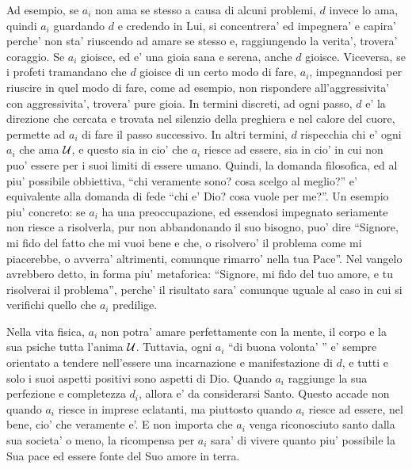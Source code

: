 Ad esempio, se $a_i$ non ama se stesso a causa di alcuni problemi, $d$ invece lo ama, quindi $a_i$ guardando $d$ e credendo in Lui, si concentrera' ed impegnera' e capira' perche' non sta' riuscendo ad amare se stesso e, raggiungendo la verita', trovera' coraggio. Se $a_i$ gioisce, ed e' una gioia sana e serena, anche $d$ gioisce. Viceversa, se i profeti tramandano che $d$ gioisce di un certo modo di fare, $a_i$, impegnandosi per riuscire in quel modo di fare, come ad esempio, non rispondere all'aggressivita' con aggressivita', trovera' pure gioia. In termini discreti, ad ogni passo, $d$ e' la direzione che cercata e trovata nel silenzio della preghiera e nel calore del cuore, permette ad $a_i$ di fare il passo successivo. In altri termini, $d$ rispecchia chi e' ogni $a_i$ che ama $\mathcal{U}$, e questo sia in cio' che $a_i$ riesce ad essere, sia in cio' in cui non puo' essere per i suoi limiti di essere umano. Quindi, la domanda filosofica, ed al piu' possibile obbiettiva, ``chi veramente sono? cosa scelgo al meglio?'' e' equivalente alla domanda di fede ``chi e' Dio? cosa vuole per me?''. 
Un esempio piu' concreto: se $a_i$ ha una preoccupazione, ed essendosi impegnato seriamente non riesce a risolverla, pur non abbandonando il suo bisogno, puo' dire ``Signore, mi fido del fatto che mi vuoi bene e che, o risolvero' il problema come mi piacerebbe, o avverra' altrimenti, comunque rimarro' nella tua Pace''. Nel vangelo avrebbero detto, in forma piu' metaforica: ``Signore, mi fido del tuo amore, e tu risolverai il problema'', perche' il risultato sara' comunque uguale al caso in cui si verifichi quello che $a_i$ predilige.

Nella vita fisica, $a_i$ non potra' amare perfettamente con la mente, il corpo e la sua psiche tutta l'anima $\mathcal{U}$. Tuttavia, ogni $a_i$ ``di buona volonta' '' e' sempre orientato a tendere nell'essere una incarnazione e manifestazione di $d$, e tutti e solo i suoi aspetti positivi sono aspetti di Dio. Quando $a_i$ raggiunge la sua perfezione e completezza $d_i$, allora e' da considerarsi Santo. Questo accade non quando $a_i$ riesce in imprese eclatanti, ma piuttosto quando $a_i$ riesce ad essere, nel bene, cio' che veramente e'. E non importa che $a_i$ venga riconosciuto santo dalla sua societa' o meno, la ricompensa per $a_i$ sara' di vivere quanto piu' possibile la Sua pace ed essere fonte del Suo amore in terra.

